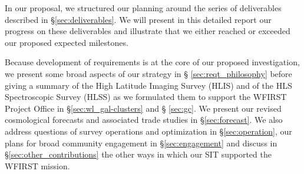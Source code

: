 \begin{summary}
In our proposal, we structured our planning around the series of deliverables
described in \S \ref{sec:deliverables}. We will present in this detailed report our progress on
these deliverables and illustrate that we either reached or exceeded our proposed
expected milestones.

Because development of requirements is at the core of our proposed
investigation, we present some broad aspects of our strategy in \S
\ref{sec:reqt_philosophy} before giving a summary of the High Latitude Imaging
Survey (HLIS) and of the HLS Spectroscopic Survey (HLSS) as we formulated them
to support the WFIRST Project Office in \S \ref{sec:wl_gal-clusters} and \S
\ref{sec:gc}. We present our revised cosmological forecasts and associated trade studies in
\S \ref{sec:forecast}. We also address questions of survey operations and
optimization in \S \ref{sec:operation}, our plans for broad community engagement
in \S \ref{sec:engagement} and discuss in \S \ref{sec:other_contributions} the
other ways in which our SIT supported the WFIRST mission.
\end{summary}



